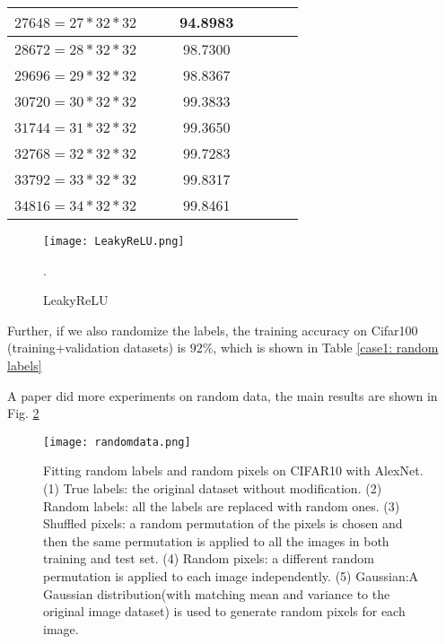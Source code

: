 \begin{table}[H]
\begin{center}
{\begin{tabular}{|c|c|c|c|c|c|c|c|}
				\tabularnewline \hline
				$27648=27*32*32$  &    &   & 94.8983  &  & &
				\tabularnewline \hline
				$28672=28*32*32$  &    &   & 98.7300  &  & &
				\tabularnewline \hline
				$29696=29*32*32$  &    &   & 98.8367   &  & &
				\tabularnewline \hline
				$30720=30*32*32$&    &   &  99.3833  &  & &
				\tabularnewline \hline
				$31744=31*32*32$  &    &  & 99.3650  &  & &
				\tabularnewline \hline
				$32768=32*32*32$  &    &  & 99.7283  &  & &
				\tabularnewline \hline
				$33792=33*32*32$  &    &   & 99.8317  &  & &
				\tabularnewline \hline
				$34816=34*32*32$  &    &   & 99.8461  &  & &
				\tabularnewline \hline
			\end{tabular} 
		}
	\end{center}
\end{table}
\begin{figure}[!htpt]
	\centering
	\texttt{[image: LeakyReLU.png]}
	\caption{LeakyReLU}.
	\label{LeakyReLU}
\end{figure}
Further, if we also randomize the labels, the training accuracy on Cifar100 (training+validation datasets) is $92\%$, which is shown in Table \ref{case1: random labels}
\begin{table}[H]
	\caption{On Cifar100: Random labels and input layer}
	\label{case1: random labels}
	\begin{center}
	\end{center}
\end{table}
A paper did more experiments on random data, the main results are shown in Fig. \ref{randomdata}
\begin{figure}[!htpt]
	\centering
	\texttt{[image: randomdata.png]}
	\caption{Fitting random labels and random pixels on CIFAR10 with AlexNet.
		(1) True labels: the original dataset without modification.
		(2) Random labels: all the labels are replaced with random ones.
		(3) Shuffled pixels: a random permutation of the pixels is chosen and then the same permutation is applied to all the images in both training and test set.
		(4) Random pixels: a different random permutation is applied to each image independently.
		(5) Gaussian:A Gaussian distribution(with matching mean and variance to the original image
		dataset) is used to generate random pixels for each image.}
	\label{randomdata}
\end{figure}
